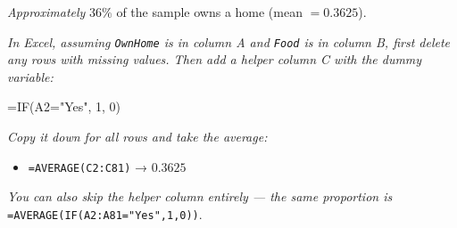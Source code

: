 \documentclass[
  11pt,
  letterpaper,
  DIV=11,
  numbers=noendperiod,
  oneside,
  open=any]{scrreprt}
\newenvironment{Shaded}{\begin{snugshade}}{\end{snugshade}}
\newcommand{\NormalTok}[1]{\textcolor[rgb]{0.00,0.23,0.31}{#1}}
\providecommand{\tightlist}{%
  \setlength{\itemsep}{0pt}\setlength{\parskip}{0pt}}\usepackage{longtable,booktabs,array}
\newenvironment{bsanswerkey}[2]{%
  \begin{tcolorbox}[bsbase, colback=bspaper2, colframe=bsline, fontupper=\small,
    title={\hypertarget{a-#1}{}\label{a-#1}\hyperlink{q-#1}{\textcolor{bsink2}{\MakeUppercase{#2}}}\hfill
      \hyperlink{q-#1}{\textcolor{bsaccent}{\normalfont\footnotesize back to page \pageref{q-#1}}}}]}%
  {\end{tcolorbox}}
\begin{document}
\begin{bsanswerkey}{bsans64}{Exercise 3, question 1}

\emph{Approximately} \(36\%\) of the sample owns a home (mean
\(=0.3625\)).

\emph{In Excel, assuming \texttt{OwnHome} is in column A and
\texttt{Food} is in column B, first delete any rows with missing values.
Then add a helper column C with the dummy variable:}

\begin{Shaded}
\begin{Highlighting}[]
\NormalTok{=IF(A2="Yes", 1, 0)}
\end{Highlighting}
\end{Shaded}

\emph{Copy it down for all rows and take the average:}

\begin{itemize}
\tightlist
\item
  \texttt{=AVERAGE(C2:C81)} → \(0.3625\)
\end{itemize}

\emph{You can also skip the helper column entirely --- the same
proportion is} \texttt{=AVERAGE(IF(A2:A81="Yes",1,0))}.

\end{bsanswerkey}
\end{document}
